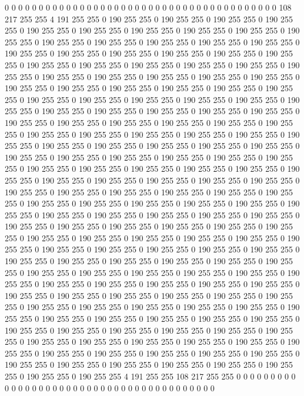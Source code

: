 0 0 0 0 0 0 0 0 0 0 0 0 0 0 0 0 0 0 0 0 0 0 0 0 0 0 0 0 0 0 0 0 0 0 0 0 0 0 0 0 108 217 255 255 4 191 255 255 0 190 255 255 0 190 255 255 0 190 255 255 0 190 255 255 0 190 255 255 0 190 255 255 0 190 255 255 0 190 255 255 0 190 255 255 0 190 255 255 0 190 255 255 0 190 255 255 0 190 255 255 0 190 255 255 0 190 255 255 0 190 255 255 0 190 255 255 0 190 255 255 0 190 255 255 0 190 255 255 0 190 255 255 0 190 255 255 0 190 255 255 0 190 255 255 0 190 255 255 0 190 255 255 0 190 255 255 0 190 255 255 0 190 255 255 0 190 255 255 0 190 255 255 0 190 255 255 0 190 255 255 0 190 255 255 0 190 255 255 0 190 255 255 0 190 255 255 0 190 255 255 
0 190 255 255 0 190 255 255 0 190 255 255 0 190 255 255 0 190 255 255 0 190 255 255 0 190 255 255 0 190 255 255 0 190 255 255 0 190 255 255 0 190 255 255 0 190 255 255 0 190 255 255 0 190 255 255 0 190 255 255 0 190 255 255 0 190 255 255 0 190 255 255 0 190 255 255 0 190 255 255 0 190 255 255 0 190 255 255 0 190 255 255 0 190 255 255 0 190 255 255 0 190 255 255 0 190 255 255 0 190 255 255 0 190 255 255 0 190 255 255 0 190 255 255 0 190 255 255 0 190 255 255 0 190 255 255 0 190 255 255 0 190 255 255 0 190 255 255 0 190 255 255 0 190 255 255 0 190 255 255 0 190 255 255 0 190 255 255 0 190 255 255 0 190 255 255 0 190 255 255 0 190 255 255 0 190 255 255 0 190 255 255 0 190 255 255 0 190 255 255 
0 190 255 255 0 190 255 255 0 190 255 255 0 190 255 255 0 190 255 255 0 190 255 255 0 190 255 255 0 190 255 255 0 190 255 255 0 190 255 255 0 190 255 255 0 190 255 255 0 190 255 255 0 190 255 255 0 190 255 255 0 190 255 255 0 190 255 255 0 190 255 255 0 190 255 255 0 190 255 255 0 190 255 255 0 190 255 255 0 190 255 255 0 190 255 255 0 190 255 255 0 190 255 255 0 190 255 255 0 190 255 255 0 190 255 255 0 190 255 255 0 190 255 255 0 190 255 255 0 190 255 255 0 190 255 255 0 190 255 255 0 190 255 255 0 190 255 255 0 190 255 255 0 190 255 255 0 190 255 255 0 190 255 255 0 190 255 255 0 190 255 255 0 190 255 255 0 190 255 255 0 190 255 255 0 190 255 255 0 190 255 255 0 190 255 255 0 190 255 255 
0 190 255 255 0 190 255 255 0 190 255 255 0 190 255 255 0 190 255 255 0 190 255 255 0 190 255 255 0 190 255 255 0 190 255 255 0 190 255 255 0 190 255 255 0 190 255 255 0 190 255 255 0 190 255 255 0 190 255 255 0 190 255 255 0 190 255 255 0 190 255 255 0 190 255 255 0 190 255 255 0 190 255 255 0 190 255 255 0 190 255 255 0 190 255 255 0 190 255 255 0 190 255 255 0 190 255 255 0 190 255 255 0 190 255 255 0 190 255 255 0 190 255 255 0 190 255 255 0 190 255 255 0 190 255 255 0 190 255 255 0 190 255 255 0 190 255 255 0 190 255 255 4 191 255 255 108 217 255 255 0 0 0 0 0 0 0 0 0 0 0 0 0 0 0 0 0 0 0 0 0 0 0 0 0 0 0 0 0 0 0 0 0 0 0 0 0 0 0 0 
